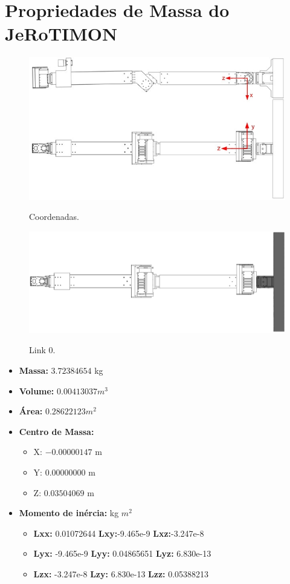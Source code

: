 \documentclass[
12pt,					%
openright,				%
twoside,				%
a4paper,				%
english,
brazil
]{ABNT/abntex2_report}
\begin{document}
	\chapter{Propriedades de Massa do JeRoTIMON}
	\label{apend:quest}
	\begin{figure}[H]
		\centering
		\caption{Coordenadas.}
		\includegraphics[scale=0.65]{appendix/coordinates.jpg}
		\label{fig:coordenadas}
	\end{figure}


	\begin{figure}[H]
		\centering
		\caption{Link 0.}
		\includegraphics[scale=1.2]{appendix/link0.jpg}
		\label{fig:link0}
	\end{figure}

	\begin{itemize}
		\item \textbf{Massa:} $3.72384654$ kg
        \item \textbf{Volume:} $0.00413037 m^{3}$
		\item \textbf{Área:} $0.28622123 m^{2}$
		\item \textbf{Centro de  Massa:}
		\begin{itemize}
			\item X: $-0.00000147$ m
			\item Y: $0.00000000$ m
			\item Z: $0.03504069$ m
		\end{itemize}				
		\item \textbf{Momento de inércia:} kg $m^{2}$
		\begin{itemize}
			\item \textbf{Lxx:}	0.01072644 \textbf{Lxy:}-9.465e-9 \textbf{Lxz:}-3.247e-8				
			\item \textbf{Lyx:} -9.465e-9 \textbf{Lyy:} 0.04865651 \textbf{Lyz:} 6.830e-13					
			\item \textbf{Lzx:} -3.247e-8 \textbf{Lzy:} 6.830e-13 \textbf{Lzz:} 0.05388213					
		\end{itemize}		
	\end{itemize}
\end{document}
